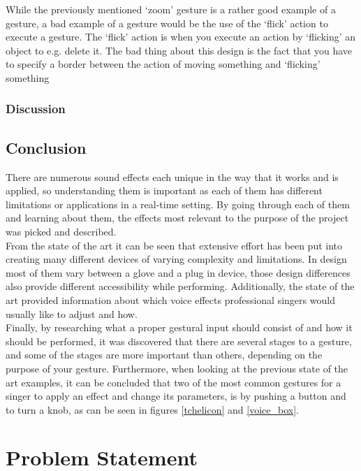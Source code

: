 While the previously mentioned ‘zoom’ gesture is a rather good example of a gesture, a bad example of a gesture would be the use of the ‘flick’ action to execute a gesture. The ‘flick’ action is when you execute an action by ‘flicking’ an object to e.g. delete it. The bad thing about this design is the fact that you have to specify a border between the action of moving something and ‘flicking’ something

\subsubsection{Discussion}




\subsection{Conclusion}

There are numerous sound effects each unique in the way that it works and is applied, so understanding them is important as each of them has different limitations or applications in a real-time setting.
By going through each of them and learning about them, the effects most relevant to the purpose of the project was picked and described.\\

From the state of the art it can be seen that extensive effort has been put into creating many different devices of varying complexity and limitations. In design most of them vary between a glove and a plug in device, those design differences also provide different accessibility while performing.
Additionally, the state of the art provided information about which voice effects professional singers would usually like to adjust and how.\\

Finally, by researching what a proper gestural input should consist of and how it should be performed, it was discovered that there are several stages to a gesture, and some of the stages are more important than others, depending on the purpose of your gesture.
Furthermore, when looking at the previous state of the art examples, it can be concluded that two of the most common gestures for a singer to apply an effect and change its parameters, is by pushing a button and to turn a knob, as can be seen in figures \ref{tchelicon} and \ref{voice_box}.

\section{Problem Statement}

